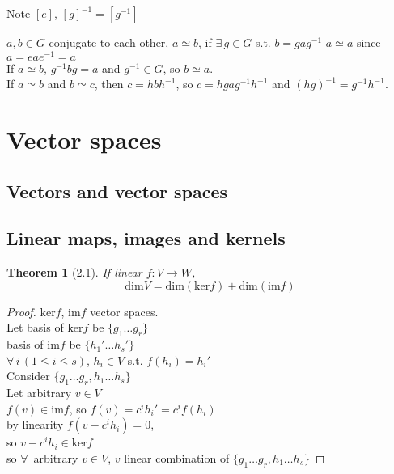 \documentclass{book}
\newtheorem{theorem}{Theorem}
\newcommand{\exercisehead}[1]
  {\smallskip
   \noindent{\large\bf Exercise #1.}
   }
\begin{document}
Note $[e]$, $[g]^{-1} = [g^{-1}]$

\exercisehead{2.7} $a,b \in G$ conjugate to each other, $a\simeq b$, if $\exists \, g \in G$ s.t. $b = gag^{-1}$
$a\simeq a$ since $a = eae^{-1} = a$ \\
If $a\simeq b$, $g^{-1}bg = a$ and $g^{-1} \in G$, so $b\simeq a$. \\
If $a \simeq b$ and $b\simeq c$, then $c = hbh^{-1}$, so $c = hg a g^{-1} h^{-1}$ and $(hg)^{-1} = g^{-1}h^{-1}$.  


\section{Vector spaces}

\subsection{Vectors and vector spaces}

\subsection{Linear maps, images and kernels}

\begin{theorem}[2.1] If linear $f: V \to W$, 
\[
\text{dim}{V} = \text{dim}{ (\text{ker}{f}) } + \text{dim}{ (\text{im}{f} ) }
\]
\end{theorem}

\begin{proof}
  $\text{ker}{f}$, $\text{im}{f}$ vector spaces.  \\

Let basis of $\text{ker}{f}$ be $\lbrace g_1 \dots g_r \rbrace$ \\
\phantom{Let } basis of $\text{im}{f}$ be $\lbrace h_1' \dots h_s' \rbrace$ \\
$\forall \, i \, (1 \leq i \leq s)$, $h_i \in V$ s.t. $f(h_i) = h_i'$ \\

Consider $\lbrace g_1 \dots g_r, h_1 \dots h_s \rbrace$ \\

Let arbitrary $v\in V$ \\
$f(v) \in \text{im}{f}$, so $f(v) = c^i h_i' = c^i f(h_i)$ \\
by linearity $f(v- c^i h_i) = 0$, \\
so $v - c^i h_i \in \text{ker}{f}$ \\
so $\forall \, $ arbitrary $v\in V$, $v$ linear combination of $\lbrace g_1 \dots g_r, h_1 \dots h_s \rbrace$
\end{proof}
\end{document}
